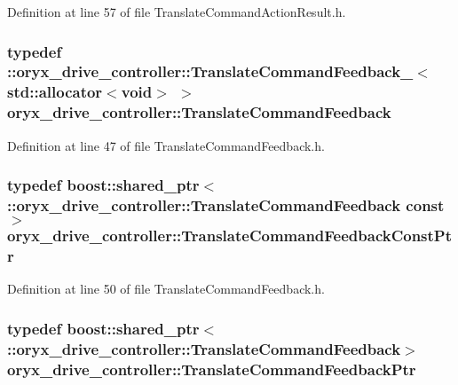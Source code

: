 \-Definition at line 57 of file \-Translate\-Command\-Action\-Result.\-h.

\subsubsection[{\-Translate\-Command\-Feedback}]{\setlength{\rightskip}{0pt plus 5cm}typedef \-::{\bf oryx\-\_\-drive\-\_\-controller\-::\-Translate\-Command\-Feedback\-\_\-}$<$std\-::allocator$<$void$>$ $>$ {\bf oryx\-\_\-drive\-\_\-controller\-::\-Translate\-Command\-Feedback}}\label{namespaceoryx__drive__controller_a24d6edc66f86f659d7cab9dab42fbe11}


\-Definition at line 47 of file \-Translate\-Command\-Feedback.\-h.

\subsubsection[{\-Translate\-Command\-Feedback\-Const\-Ptr}]{\setlength{\rightskip}{0pt plus 5cm}typedef boost\-::shared\-\_\-ptr$<$ \-::{\bf oryx\-\_\-drive\-\_\-controller\-::\-Translate\-Command\-Feedback} const$>$ {\bf oryx\-\_\-drive\-\_\-controller\-::\-Translate\-Command\-Feedback\-Const\-Ptr}}\label{namespaceoryx__drive__controller_aea242e1d3048b85819609d6de7da41bf}


\-Definition at line 50 of file \-Translate\-Command\-Feedback.\-h.

\subsubsection[{\-Translate\-Command\-Feedback\-Ptr}]{\setlength{\rightskip}{0pt plus 5cm}typedef boost\-::shared\-\_\-ptr$<$ \-::{\bf oryx\-\_\-drive\-\_\-controller\-::\-Translate\-Command\-Feedback}$>$ {\bf oryx\-\_\-drive\-\_\-controller\-::\-Translate\-Command\-Feedback\-Ptr}}\label{namespaceoryx__drive__controller_a99b66a2702ea01b48bdf070cff8e6ab2}


